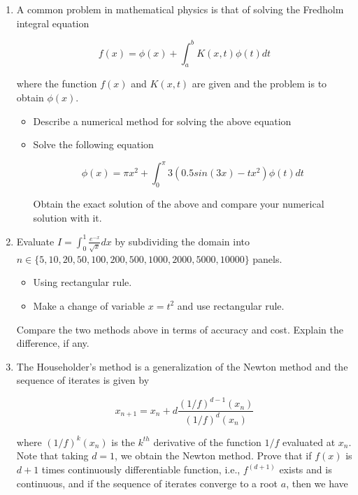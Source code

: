 \documentclass{article}
\begin{document}
\begin{enumerate}
\item A common problem in mathematical physics is that of solving the Fredholm integral
equation

\begin{equation*}
f(x) = \phi(x) + \displaystyle \int_{a}^{b} K(x,t) \phi(t) dt
\end{equation*}

where the function $f(x)$ and $K(x,t)$ are given and the problem is to obtain $\phi(x)$.

\begin{itemize}
\item Describe a numerical method for solving the above equation
\item Solve the following equation

\begin{equation*}
\phi(x) = \pi x^{2} + \displaystyle \int_{0}^{\pi} 3 (0.5 sin(3x) - tx^{2}) \phi(t) dt
\end{equation*}

Obtain the exact solution of the above and compare your numerical solution with it.
\end{itemize}

\item Evaluate $I = \displaystyle \int_{0}^{1} \frac{e^{-x}}{\sqrt{x}} dx$ by subdividing
the domain into $ n \in \{5, 10, 20, 50, 100, 200, 500, 1000, 2000, 5000, 10000 \}$ panels.

\begin{itemize}
    \item Using rectangular rule.
    \item Make a change of variable $x = t^{2}$ and use rectangular rule.
\end{itemize}

Compare the two methods above in terms of accuracy and cost. Explain the difference, if
any.

\item The Householder's method is a generalization of the Newton method and the sequence
of iterates is given by

\begin{equation*}
x_{n+1} = x_{n} + d \frac{(1/f)^{d-1} (x_{n})}{(1/f)^{d} (x_{n})}
\end{equation*}

where $(1/f)^{k} (x_{n})$ is the $k^{th}$ derivative of the function $1/f$ evaluated at 
$x_{n}$. Note that taking $d = 1$, we obtain the Newton method. Prove that if $f(x)$ is 
$d + 1$ times continuously differentiable function, i.e., $f^{(d+1)}$ exists and is
continuous, and if the sequence of iterates converge to a root $a$, then we have


\end{enumerate}
\end{document}
